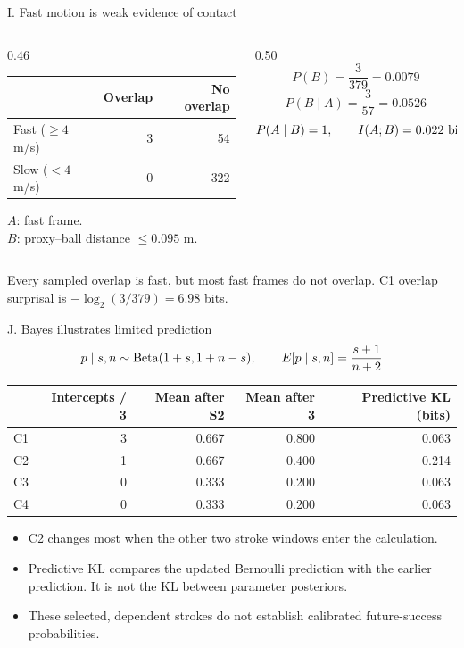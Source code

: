 \begin{frame}{I. Fast motion is weak evidence of contact}
\begin{columns}[c,onlytextwidth]
\begin{column}{0.46\textwidth}
\centering\small
\begin{tabular}{@{}lrr@{}}\toprule
 & Overlap & No overlap\\\midrule
Fast ($\geq4$ m/s) & 3 & 54\\
Slow ($<4$ m/s) & 0 & 322\\\bottomrule
\end{tabular}\par
\par\bigskip\raggedright
$A$: fast frame.\\[4pt]
$B$: proxy--ball distance $\leq0.095$ m.
\end{column}
\begin{column}{0.50\textwidth}
\[
P(B)=\frac{3}{379}=0.0079
\]
\[
P(B\mid A)=\frac{3}{57}=0.0526
\]
\[
P(A\mid B)=1,\qquad I(A;B)=0.022\ {\rm bits}
\]
\end{column}
\end{columns}
\par\bigskip
\small Every sampled overlap is fast, but most fast frames do not overlap. C1 overlap surprisal is $-\log_2(3/379)=6.98$ bits.
\end{frame}

\begin{frame}{J. Bayes illustrates limited prediction}
\[
p\mid s,n\sim{\rm Beta}(1+s,1+n-s),
\qquad E[p\mid s,n]=\frac{s+1}{n+2}
\]
\centering\small
\begin{tabular}{@{}lrrrr@{}}\toprule
 & Intercepts / 3 & Mean after S2 & Mean after 3 & Predictive KL (bits)\\\midrule
C1 & 3 & 0.667 & 0.800 & 0.063\\
C2 & 1 & 0.667 & 0.400 & 0.214\\
C3 & 0 & 0.333 & 0.200 & 0.063\\
C4 & 0 & 0.333 & 0.200 & 0.063\\\bottomrule
\end{tabular}\par
\par\bigskip\raggedright
\begin{itemize}
\item C2 changes most when the other two stroke windows enter the calculation.
\item Predictive KL compares the updated Bernoulli prediction with the earlier prediction. It is not the KL between parameter posteriors.
\item These selected, dependent strokes do not establish calibrated future-success probabilities.
\end{itemize}
\end{frame}

